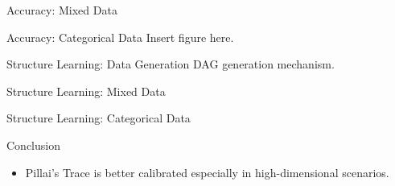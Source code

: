 \documentclass{beamer}
\begin{document}
\begin{frame}{Accuracy: Mixed Data}
\end{frame}

\begin{frame}{Accuracy: Categorical Data}
	Insert figure here.
\end{frame}


\begin{frame}{Structure Learning: Data Generation}
	DAG generation mechanism.
\end{frame}

\begin{frame}{Structure Learning: Mixed Data}
\end{frame}

\begin{frame}{Structure Learning: Categorical Data}
\end{frame}

\begin{frame}{Conclusion}
	\begin{itemize}
		\item Pillai's Trace is better calibrated especially in high-dimensional scenarios.
	\end{itemize}
\end{frame}
\end{document}

